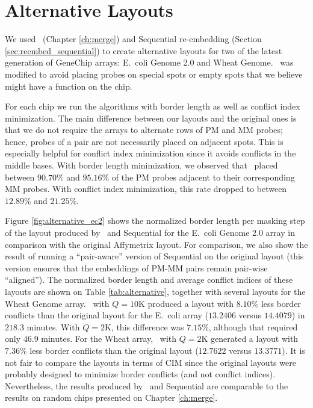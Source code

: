 \section{Alternative Layouts}
\label{sec:affy_alternative}

We used \Greedyplus\ (Chapter \ref{ch:merge}) and Sequential re-embedding
(Section \ref{sec:reembed_sequential}) to create alternative layouts for two of
the latest generation of GeneChip arrays: E.\ coli Genome 2.0 and Wheat Genome.
\Greedyplus\ was modified to avoid placing probes on special spots or empty
spots that we believe might have a function on the chip.

For each chip we run the algorithms with border length as well as conflict index
minimization. The main difference between our layouts and the original ones is
that we do not require the arrays to alternate rows of PM and MM probes; hence,
probes of a pair are not necessarily placed on adjacent spots. This is
especially helpful for conflict index minimization since it avoids conflicts in
the middle bases. With border length minimization, we observed that \Greedyplus\
placed between $90.70\%$ and $95.16\%$ of the PM probes adjacent to their
corresponding MM probes. With conflict index minimization, this rate dropped to
between $12.89\%$ and $21.25\%$.

Figure \ref{fig:alternative_ec2} shows the normalized border length per masking
step of the layout produced by \Greedyplus\ and Sequential for the E.\ coli
Genome 2.0 array in comparison with the original Affymetrix layout. For
comparison, we also show the result of running a ``pair-aware'' version of
Sequential on the original layout (this version ensures that the embeddings of
PM-MM pairs remain pair-wise ``aligned''). The normalized border length and
average conflict indices of these layouts are shown on Table
\ref{tab:alternative}, together with several layouts for the Wheat Genome array.
\Greedyplus\ with $Q=10$K produced a layout with $8.10\%$ less border conflicts
than the original layout for the E.\ coli array ($13.2406$ versus $14.4079$) in
$218.3$ minutes. With $Q=2$K, this difference was $7.15\%$, although that
required only $46.9$ minutes. For the Wheat array, \Greedyplus\ with $Q=2$K
generated a layout with $7.36\%$ less border conflicts than the original layout
($12.7622$ versus $13.3771$). It is not fair to compare the layouts in terms of
CIM since the original layouts were probably designed to minimize border
conflicts (and not conflict indices). Nevertheless, the results produced by
\Greedyplus\ and Sequential are comparable to the results on random chips
presented on Chapter \ref{ch:merge}.

